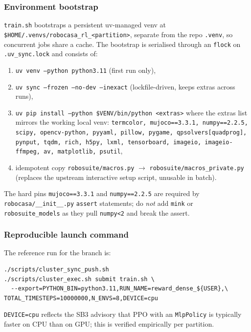 \documentclass[11pt]{article}
\begin{document}
\subsubsection*{Environment bootstrap}
\texttt{train.sh} bootstraps a persistent uv-managed venv at
\texttt{\$HOME/.venvs/robocasa\_rl\_<partition>}, separate from the repo
\texttt{.venv}, so concurrent jobs share a cache. The bootstrap is serialised
through an \texttt{flock} on \texttt{.uv\_sync.lock} and consists of:
\begin{enumerate}
  \item \texttt{uv venv --python python3.11} (first run only),
  \item \texttt{uv sync --frozen --no-dev --inexact} (lockfile-driven, keeps
    extras across runs),
  \item \texttt{uv pip install --python \$VENV/bin/python <extras>} where the
    extras list mirrors the working local venv:
    \texttt{termcolor, mujoco==3.3.1, numpy==2.2.5, scipy, opencv-python,
    pyyaml, pillow, pygame, qpsolvers[quadprog], pynput, tqdm, rich, h5py,
    lxml, tensorboard, imageio, imageio-ffmpeg, av, matplotlib, psutil},
  \item idempotent copy
    \texttt{robosuite/macros.py} $\to$ \texttt{robosuite/macros\_private.py}
    (replaces the upstream interactive setup script, unusable in batch).
\end{enumerate}
The hard pins \texttt{mujoco==3.3.1} and \texttt{numpy==2.2.5} are required by
\texttt{robocasa/\_\_init\_\_.py} \texttt{assert} statements; do \emph{not}
add \texttt{mink} or \texttt{robosuite\_models} as they pull \texttt{numpy<2}
and break the assert.

\subsubsection*{Reproducible launch command}
The reference run for the branch is:
\begin{lstlisting}
./scripts/cluster_sync_push.sh
./scripts/cluster_exec.sh submit train.sh \
  --export=PYTHON_BIN=python3.11,RUN_NAME=reward_dense_${USER},\
TOTAL_TIMESTEPS=10000000,N_ENVS=8,DEVICE=cpu
\end{lstlisting}
\texttt{DEVICE=cpu} reflects the SB3 advisory that PPO with an
\texttt{MlpPolicy} is typically faster on CPU than on GPU; this is verified
empirically per partition.
\end{document}
